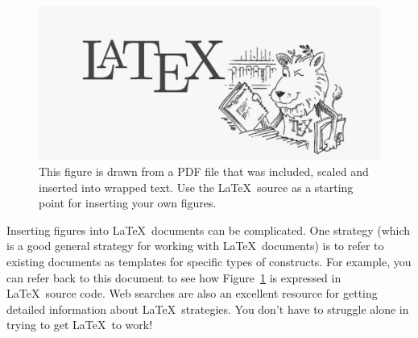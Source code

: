 \documentclass{IEEEtran}
\begin{document}
\begin{figure}

\centering
\includegraphics[frame, scale=0.1]{LaTeX_Lion.pdf}
\caption{\footnotesize This figure is drawn from a PDF file that 
was included, scaled and inserted into wrapped text.  Use the \LaTeX\ 
source as a starting point for inserting your own figures.}
\label{fig_latex_lion}

\end{figure}
Inserting figures into \LaTeX\ documents can be complicated.  One strategy (which is a good general strategy for working with \LaTeX\ documents) is to refer to existing documents as templates for specific types of constructs.  For example, you can refer back to this document to see how Figure~\ref{fig_latex_lion} is expressed in \LaTeX\ source code. Web searches are also an excellent resource for getting detailed information about \LaTeX\ strategies.  You don't have to struggle alone in trying to get \LaTeX\ to work!
\end{document}
